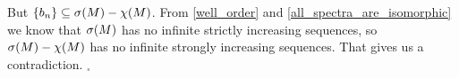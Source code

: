 But $\{b_n\} \subseteq {{\sigma}(M)} - \chi(M)$. 
From \ref{well_order} and \ref{all_spectra_are_isomorphic} we know that ${{\sigma}(M)}$ has no infinite 
strictly increasing sequences, so 
${{\sigma}(M)} - \chi(M)$ has no infinite strongly increasing sequences. That gives us a 
contradiction. 
$_\square$ 



 
